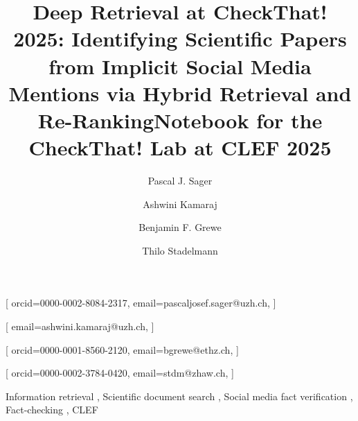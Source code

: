 \documentclass[
]{ceurart}
\begin{document}



\title{Deep Retrieval at CheckThat! 2025: Identifying Scientific Papers from Implicit Social Media Mentions via Hybrid Retrieval and Re-Ranking}
\title[mode=sub]{Notebook for the CheckThat! Lab at CLEF 2025}


\author[1,2,3]{Pascal J. Sager}[%
orcid=0000-0002-8084-2317,
email=pascaljosef.sager@uzh.ch,
]
\cormark[1]

\author[1]{Ashwini Kamaraj}[%
email=ashwini.kamaraj@uzh.ch,
]

\author[3]{Benjamin F. Grewe}[%
orcid=0000-0001-8560-2120,
email=bgrewe@ethz.ch,
]

\author[2,4]{Thilo Stadelmann}[%
orcid=0000-0002-3784-0420,
email=stdm@zhaw.ch,
]

\address[1]{University of Zurich, Rämistrasse 71, 8006 Zurich, Switzerland}
\address[2]{Centre for Artificial Intelligence, Zurich University of Applied Sciences, Technikumstrasse 71, 8401 Winterthur, Switzerland}
\address[3]{Institute of Neuroinformatics, ETH Zurich and University of Zurich, Winterthurerstrasse 190, 8057 Zurich, Switzerland}
\address[4]{European Centre for Living Technology, Dorsoduro 3246, 30123 Venice, Italy}






\begin{keywords}
    Information retrieval \sep
    Scientific document search \sep
    Social media fact verification \sep
    Fact-checking \sep
    CLEF
\end{keywords}
\end{document}
